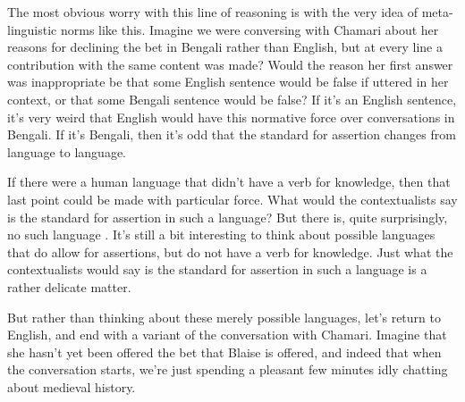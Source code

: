 \documentclass[11pt,]{book}
\begin{document}
The most obvious worry with this line of reasoning is with the very idea of meta-linguistic norms like this. Imagine we were conversing with Chamari about her reasons for declining the bet in Bengali rather than English, but at every line a contribution with the same content was made? Would the reason her first answer was inappropriate be that some English sentence would be false if uttered in her context, or that some Bengali sentence would be false? If it's an English sentence, it's very weird that English would have this normative force over conversations in Bengali. If it's Bengali, then it's odd that the standard for assertion changes from language to language.

If there were a human language that didn't have a verb for knowledge, then that last point could be made with particular force. What would the contextualists say is the standard for assertion in such a language? But there is, quite surprisingly, no such language \citep{Nagel2014}. It's still a bit interesting to think about possible languages that do allow for assertions, but do not have a verb for knowledge. Just what the contextualists would say is the standard for assertion in such a language is a rather delicate matter.

But rather than thinking about these merely possible languages, let's return to English, and end with a variant of the conversation with Chamari. Imagine that she hasn't yet been offered the bet that Blaise is offered, and indeed that when the conversation starts, we're just spending a pleasant few minutes idly chatting about medieval history.
\end{document}
